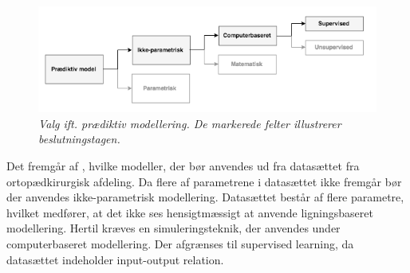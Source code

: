 \begin{figure}[H]
	\centering
	\includegraphics[scale=.73]{figures/praediktivmodel.png}
	\caption{\textit{Valg ift. prædiktiv modellering. De markerede felter illustrerer beslutningstagen.}}
	\label{praediktiv}
\end{figure}

\noindent 
Det fremgår af , hvilke modeller, der bør anvendes ud fra datasættet fra ortopædkirurgisk afdeling.
Da flere af parametrene i datasættet ikke fremgår bør der anvendes ikke-parametrisk modellering. Datasættet består af flere parametre, hvilket medfører, at det ikke ses hensigtmæssigt at anvende ligningsbaseret modellering. Hertil kræves en simuleringsteknik, der anvendes under computerbaseret modellering. Der afgrænses til supervised learning, da datasættet indeholder input-output relation.




